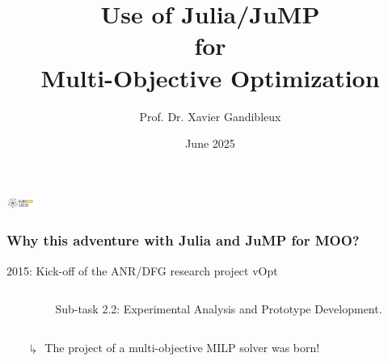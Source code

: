 \documentclass[]{beamer}
\title[Julia]{{\textbf{\LARGE{Use of Julia/JuMP \\ for \\ Multi-Objective Optimization}}}}
\date{June 2025}
\author{Prof. Dr. Xavier Gandibleux \vspace{-3mm}}
\institute{Nantes Université, France}
\newcommand*{\blue}[1]{\textcolor{nblue}{#1}}
\begin{document}
% 
%

\begin{frame}
  \titlepage
  \vspace{-1cm}
\end{frame}


{ 
  \hfill \includegraphics[height=0.4cm]{logoEuro2025.png} \hfill
{}
\vskip4pt%
}


% 
%

\begin{frame}
  \frametitle{Why this adventure with Julia and JuMP for MOO?}
\vspace{3mm}


    2015: Kick-off of  the ANR/DFG research project  \blue{vOpt}  \vspace{1.25mm}\\
    \begin{columns}
      \begin{column}{0.05\textwidth}
      \end{column}
      \begin{column}{0.85\textwidth}
              {\tiny
Sub-task 2.2: Experimental Analysis and Prototype Development.\vspace{10mm}\\}
      
      \end{column}
      \end{columns}

\begin{itemize}
\item[$\drsh$] The project of a \blue{multi-objective MILP solver} was born!
\end{itemize}            
      \bigskip
      

    

    
      
\end{frame}
\end{document}

